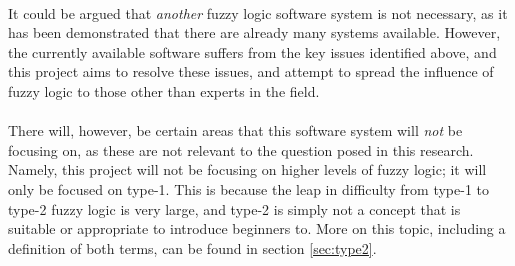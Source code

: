 \ \\
It could be argued that \textit{another} fuzzy logic software system is not necessary, as it has been demonstrated that there are already many systems available. However, the currently available software suffers from the key issues identified above, and this project aims to resolve these issues, and attempt to spread the influence of fuzzy logic to those other than experts in the field.\ \\
\ \\
There will, however, be certain areas that this software system will \textit{not} be focusing on, as these are not relevant to the question posed in this research. Namely, this project will not be focusing on higher levels of fuzzy logic; it will only be focused on type-1. This is because the leap in difficulty from type-1 to type-2 fuzzy logic is very large, and type-2 is simply not a concept that is suitable or appropriate to introduce beginners to. More on this topic, including a definition of both terms, can be found in section \ref{sec:type2}.